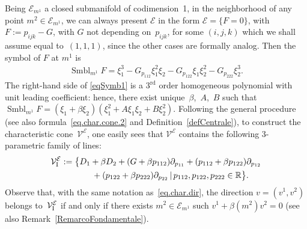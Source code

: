 \documentclass[pdftex]{sigma}
\newcommand{\R}{\mathbb{R}}
\newcommand{\M}{\mathcal{V}}
\newcommand{\MM}{\mathcal{V}_{\textrm{\normalfont I}}}
\newcommand{\E}{\mathcal{E}}
\newcommand{\Rd}{^\textrm{rd}}
\numberwithin{equation}{section}
\begin{document}
Being $\E_{m^1}$ a closed submanifold of codimension~1, in the neighborhood of any point $m^2\in \E_{m^1}$, we can always present $\E$ in the form $\E=\{F=0\}$, with $F:= p_{ijk}-G$, with $G$ not depending on~$p_{ijk}$, for some $(i,j,k)$ which we shall assume equal to~$(1,1,1)$, since the other cases are formally analog. Then the symbol of $F$ at $m^1$ is
\begin{gather}\label{eqSymb1}
\operatorname{Smbl}_{m^1}F=\xi_1^3-G_{p_{112}}\xi_1^2\xi_2-G_{p_{122}}\xi_1\xi_2^2-G_{p_{222}}\xi_2^3.
\end{gather}
The right-hand side of \eqref{eqSymb1} is a $3\Rd$ order homogeneous polynomial with unit leading coef\/f\/icient: hence, there exist unique~$\beta$,~$A$,~$B$ such that
$\operatorname{Smbl}_{m^1}F=(\xi_1+\beta\xi_2)(\xi_1^2+A\xi_1\xi_2+B\xi_2^2)$.
Following the general procedure (see also formula~\eqref{eq.char.cone.2} and Def\/inition~\ref{defCentrale}), to construct the characteristic cone~$\M^\E$, one easily sees that $\M^\E$ contains
 the following 3-parametric family of lines:
 \begin{gather*}
\MM^\E:=\big\{ D_1+\beta D_2+ (G+\beta p_{112})\partial_{p_{11}}+ (p_{112}+\beta p_{122})\partial_{p_{12}}\\
\hphantom{\MM^\E:=\big\{}{} + (p_{122}+\beta p_{222})\partial_{p_{22}} \,|\, p_{112},p_{122},p_{222}\in \R \big\}.
\end{gather*}
Observe that, with the same notation as~\eqref{eq.char.dir}, the direction $v=(v^1,v^2)$ belongs to~$\MM^\E$ if and only if there exists $m^2\in\E_{m^1}$ such $v^1+\beta (m^2) v^2=0$ (see also Remark~\ref{RemarcoFondamentale}).
\end{document}
